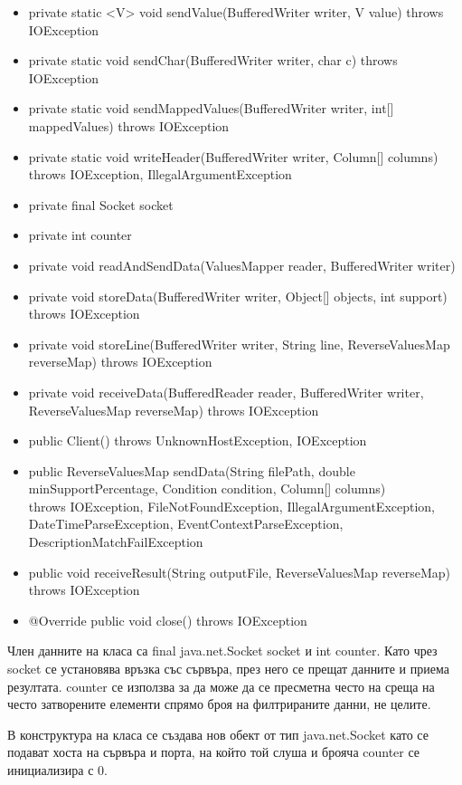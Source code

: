 \documentclass[a4paper, 12pt]{article}
\begin{document}
\begin{itemize}
\item private static <V> void sendValue(BufferedWriter writer, V value) throws IOException
\item private static void sendChar(BufferedWriter writer, char c) throws IOException
\item private static void sendMappedValues(BufferedWriter writer, int[] mappedValues) throws IOException
\item private static void writeHeader(BufferedWriter writer, Column[] columns) throws IOException, IllegalArgumentException
\item private final Socket socket
\item private int counter
\item private void readAndSendData(ValuesMapper reader, BufferedWriter writer)
\item private void storeData(BufferedWriter writer, Object[] objects, int support) throws IOException
\item private void storeLine(BufferedWriter writer, String line, ReverseValuesMap reverseMap) throws IOException
\item private void receiveData(BufferedReader reader, BufferedWriter writer, ReverseValuesMap reverseMap) throws IOException
\item public Client() throws UnknownHostException, IOException
\item public ReverseValuesMap sendData(String filePath, double minSupportPercentage, Condition condition, Column[] columns) \\
                            throws IOException, FileNotFoundException, IllegalArgumentException,
                            DateTimeParseException, EventContextParseException, DescriptionMatchFailException
\item public void receiveResult(String outputFile, ReverseValuesMap reverseMap) throws IOException
\item @Override public void close() throws IOException
\end{itemize}
Член данните на класа са final java.net.Socket socket и int counter.
Като чрез socket се установява връзка със сървъра, през него се прещат данните и приема резултата.
counter се използва за да може да се пресметна често на среща на често затворените елементи спрямо броя на филтрираните данни,
не целите.

В конструктура на класа се създава нов обект от тип java.net.Socket като се подават хоста на сървъра и порта, на който той слуша
и брояча counter се инициализира с 0.
\end{document}
